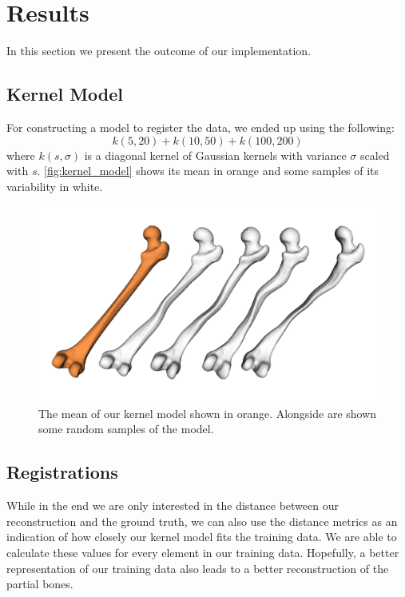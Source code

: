 \section{Results}
\label{sec:results}

In this section we present the outcome of our implementation.


\subsection{Kernel Model}
\label{subsec:kernmodel}

For constructing a model to register the data, we ended up using the following: 
$$ k(5, 20) + k(10, 50) + k(100, 200) $$
where $k(s, \sigma)$ is a diagonal kernel of Gaussian kernels with variance $\sigma$ scaled with $s$. 
\autoref{fig:kernel_model} shows its mean in orange and some samples of its variability in white.

\begin{figure}
	\centering
  \includegraphics[width=\columnwidth]{./Figures/kernel_model_samples}
  \caption{
    The mean of our kernel model shown in orange. 
    Alongside are shown some random samples of the model.}
  \label{fig:kernel_model}
\end{figure}


\subsection{Registrations}
\label{subsec:registrresults}
While in the end we are only interested in the distance between our reconstruction and the ground truth, we can also use the distance metrics as an indication of how closely our kernel model fits the training data. 
We are able to calculate these values for every element in our training data.
Hopefully, a better representation of our training data also leads to a better reconstruction of the partial bones. 

